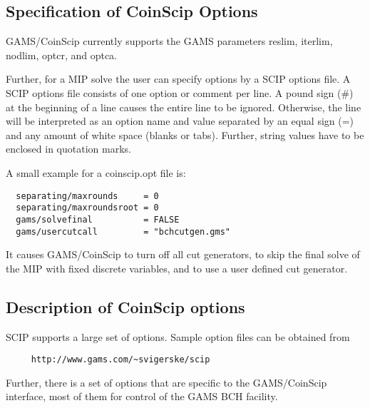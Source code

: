 \subsection{Specification of CoinScip Options}

GAMS/CoinScip currently supports the GAMS parameters reslim, iterlim, nodlim, optcr, and optca.

Further, for a MIP solve the user can specify options by a SCIP options file.
A SCIP options file consists of one option or comment per line.
A pound sign (\#) at the beginning of a line causes the entire line to be ignored.
Otherwise, the line will be interpreted as an option name and value separated by an equal sign (=) and any amount of white space (blanks or tabs).
Further, string values have to be enclosed in quotation marks.

A small example for a coinscip.opt file is:
\begin{verbatim}
  separating/maxrounds     = 0
  separating/maxroundsroot = 0
  gams/solvefinal          = FALSE
  gams/usercutcall         = "bchcutgen.gms"
\end{verbatim}
It causes GAMS/CoinScip to turn off all cut generators, to skip the final solve of the MIP with fixed discrete variables, and to use a user defined cut generator.

\subsection{Description of CoinScip options}

SCIP supports a large set of options.
Sample option files can be obtained from
\begin{verbatim}
     http://www.gams.com/~svigerske/scip
\end{verbatim}

Further, there is a set of options that are specific to the GAMS/CoinScip interface, most of them for control of the GAMS BCH facility.

